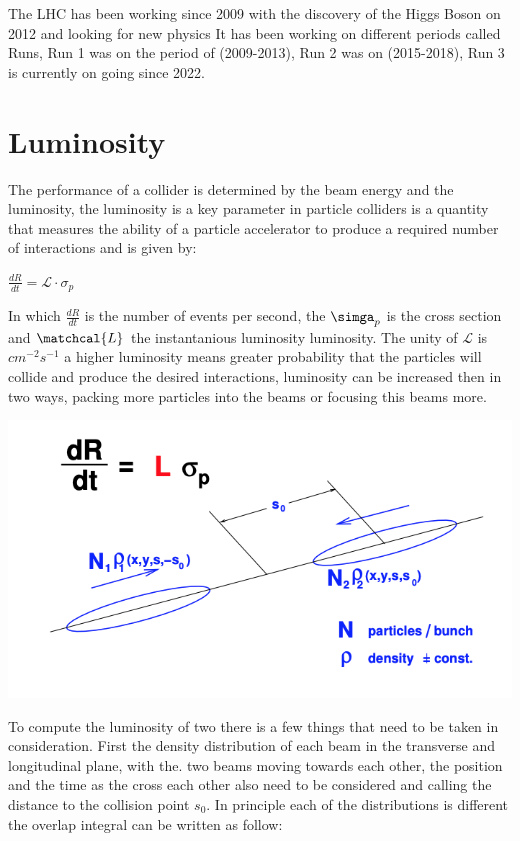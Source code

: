 The LHC has been working since 2009 with the discovery of the Higgs Boson on 2012 and looking for new physics It has been working on different periods called Runs, Run 1 was on the period of (2009-2013), Run 2 was on (2015-2018), Run 3 is currently on going since 2022. 



\section{Luminosity}

The performance of a collider is determined by the beam energy and the luminosity, the luminosity is a key parameter in particle colliders is a quantity that measures the ability of a particle accelerator to produce a required number of interactions and is given by: \cite{Lum} 

$\frac{dR}{dt} = \mathcal{L} \cdot \sigma_{p} $ 

In which $\frac{dR}{dt}$ is the number of events per second, the $\simga_{p}$ is the cross section and $\matchcal{L}$ the instantanious luminosity luminosity. The unity of $\mathcal{L}$ is  $cm^{-2} s^{-1}$ a higher luminosity means greater probability that the particles will collide and produce the desired interactions, luminosity can be increased then in two ways, packing more particles into the beams or focusing this beams more.  

 \includegraphics[scale=0.80]{lumii.png}


To compute the luminosity of two there is a few things that need to be taken in consideration. First the density distribution of each beam in the transverse and longitudinal plane, with the. two beams moving towards each other, the position and the time as the cross each other also need to be considered and calling the distance to the collision point $s_{0}$. In principle each of the distributions is different the overlap integral can be written as follow:

